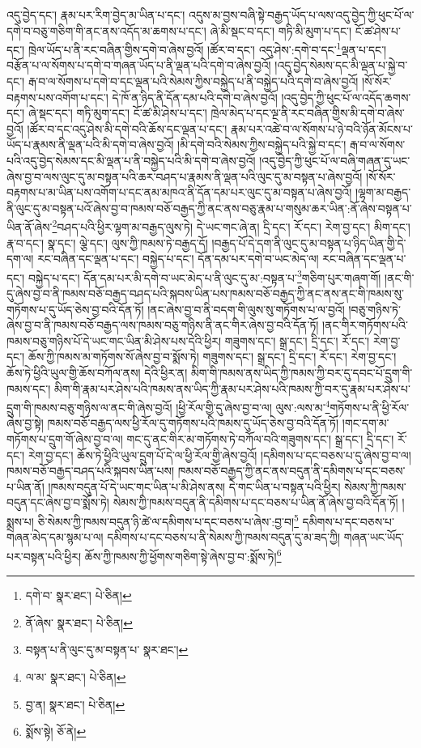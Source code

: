 འདུ་བྱེད་དང་། རྣམ་པར་རིག་བྱེད་མ་ཡིན་པ་དང་། འདུས་མ་བྱས་བཞི་སྟེ་བརྒྱད་ཡོད་པ་ལས་འདུ་བྱེད་ཀྱི་ཕུང་པོ་ལ་དགེ་བ་བཅུ་གཅིག་གི་ནང་ནས་འདོད་མ་ཆགས་པ་དང་། ཞེ་མི་སྡང་བ་དང་། གཏི་མི་མུག་པ་དང་། ངོ་ཚ་ཤེས་པ་དང་། ཁྲེལ་ཡོད་པ་ནི་རང་བཞིན་གྱིས་དགེ་བ་ཞེས་བྱའོ། །ཚོར་བ་དང་། འདུ་ཤེས་:དགེ་བ་དང་\footnote{དགེ་བ་  སྣར་ཐང་།  པེ་ཅིན། }ལྡན་པ་དང་། བརྩོན་པ་ལ་སོགས་པ་དགེ་བ་གཞན་ཡོད་པ་ནི་ལྡན་པའི་དགེ་བ་ཞེས་བྱའོ། །འདུ་བྱེད་སེམས་དང་མི་ལྡན་པ་སྐྱེ་བ་དང་། རྒ་བ་ལ་སོགས་པ་དགེ་བ་དང་ལྡན་པའི་སེམས་ཀྱིས་བསྐྱེད་པ་ནི་བསྐྱེད་པའི་དགེ་བ་ཞེས་བྱའོ། །སོ་སོར་བརྟགས་པས་འགོག་པ་དང་། དེ་ཁོ་ན་ཉིད་ནི་དོན་དམ་པའི་དགེ་བ་ཞེས་བྱའོ། །འདུ་བྱེད་ཀྱི་ཕུང་པོ་ལ་འདོད་ཆགས་དང་། ཞེ་སྡང་དང་། གཏི་མུག་དང་། ངོ་ཚ་མི་ཤེས་པ་དང་། ཁྲེལ་མེད་པ་དང་ལྔ་ནི་རང་བཞིན་གྱིས་མི་དགེ་བ་ཞེས་བྱའོ། །ཚོར་བ་དང་འདུ་ཤེས་མི་དགེ་བའི་ཆོས་དང་ལྡན་པ་དང་། རྣམ་པར་འཚེ་བ་ལ་སོགས་པ་ཉེ་བའི་ཉོན་མོངས་པ་ཡོད་པ་རྣམས་ནི་ལྡན་པའི་མི་དགེ་བ་ཞེས་བྱའོ། །མི་དགེ་བའི་སེམས་ཀྱིས་བསྐྱེད་པའི་སྐྱེ་བ་དང་། རྒ་བ་ལ་སོགས་པའི་འདུ་བྱེད་སེམས་དང་མི་ལྡན་པ་ནི་བསྐྱེད་པའི་མི་དགེ་བ་ཞེས་བྱའོ། །འདུ་བྱེད་ཀྱི་ཕུང་པོ་ལ་བཞི་གཞན་དུ་ཡང་ཞེས་བྱ་བ་ལས་ལུང་དུ་མ་བསྟན་པའི་ཆར་བཤད་པ་རྣམས་ནི་ལྡན་པའི་ལུང་དུ་མ་བསྟན་པ་ཞེས་བྱའོ། །སོ་སོར་བརྟགས་པ་མ་ཡིན་པས་འགོག་པ་དང་ནམ་མཁའ་ནི་དོན་དམ་པར་ལུང་དུ་མ་བསྟན་པ་ཞེས་བྱའོ། །ལྷག་མ་བརྒྱད་ནི་ལུང་དུ་མ་བསྟན་པའོ་ཞེས་བྱ་བ་ཁམས་བཅོ་བརྒྱད་ཀྱི་ནང་ནས་བཅུ་རྣམ་པ་གསུམ་ཆར་ཡིན་:ནོ་ཞེས་བསྟན་པ་ཡིན་ནོ་ཞེས་\footnote{ནོ་ཞེས་  སྣར་ཐང་།  པེ་ཅིན། }བཤད་པའི་ཕྱིར་ལྷག་མ་བརྒྱད་ལུས་ཏེ། དེ་ཡང་གང་ཞེ་ན། དྲི་དང་། རོ་དང་། རེག་བྱ་དང་། མིག་དང་། རྣ་བ་དང་། སྣ་དང་། ལྕེ་དང་། ལུས་ཀྱི་ཁམས་ཏེ་བརྒྱད་དོ། །བརྒྱད་པོ་དེ་དག་ནི་ལུང་དུ་མ་བསྟན་པ་ཉིད་ཡིན་གྱི་དེ་དག་ལ། རང་བཞིན་དང་ལྡན་པ་དང་། བསྐྱེད་པ་དང་། དོན་དམ་པར་དགེ་བ་ཡང་མེད་ལ། རང་བཞིན་དང་ལྡན་པ་དང་། བསྐྱེད་པ་དང་། དོན་དམ་པར་མི་དགེ་བ་ཡང་མེད་པ་ནི་ལུང་དུ་མ་:བསྟན་པ་\footnote{བསྟན་པ་ནི་ལུང་དུ་མ་བསྟན་པ་  སྣར་ཐང་། }གཅིག་པུར་གཞག་གོ། །ནང་གི་དུ་ཞེས་བྱ་བ་ནི་ཁམས་བཅོ་བརྒྱད་བཤད་པའི་སྐབས་ཡིན་པས་ཁམས་བཅོ་བརྒྱད་ཀྱི་ནང་ནས་ནང་གི་ཁམས་སུ་གཏོགས་པ་དུ་ཡོད་ཅེས་བྱ་བའི་དོན་ཏོ། །ནང་ཞེས་བྱ་བ་ནི་བདག་གི་ལུས་སུ་གཏོགས་པ་ལ་བྱའོ། །བཅུ་གཉིས་ཏེ་ཞེས་བྱ་བ་ནི་ཁམས་བཅོ་བརྒྱད་ལས་ཁམས་བཅུ་གཉིས་ནི་ནང་གིར་ཞེས་བྱ་བའི་དོན་ཏོ། །ནང་གིར་གཏོགས་པའི་ཁམས་བཅུ་གཉིས་པོ་དེ་ཡང་གང་ཡིན་མི་ཤེས་པས་དེའི་ཕྱིར། གཟུགས་དང་། སྒྲ་དང་། དྲི་དང་། རོ་དང་། རེག་བྱ་དང་། ཆོས་ཀྱི་ཁམས་མ་གཏོགས་སོ་ཞེས་བྱ་བ་སྨོས་ཏེ། གཟུགས་དང་། སྒྲ་དང་། དྲི་དང་། རོ་དང་། རེག་བྱ་དང་། ཆོས་ཏེ་ཕྱིའི་ཡུལ་གྱི་ཆོས་བཀོལ་ནས། དེའི་ཕྱིར་ན། མིག་གི་ཁམས་ནས་ཡིད་ཀྱི་ཁམས་ཀྱི་བར་དུ་དབང་པོ་དྲུག་གི་ཁམས་དང་། མིག་གི་རྣམ་པར་ཤེས་པའི་ཁམས་ནས་ཡིད་ཀྱི་རྣམ་པར་ཤེས་པའི་ཁམས་ཀྱི་བར་དུ་རྣམ་པར་ཤེས་པ་དྲུག་གི་ཁམས་བཅུ་གཉིས་ལ་ནང་གི་ཞེས་བྱའོ། །ཕྱི་རོལ་གྱི་དུ་ཞེས་བྱ་བ་ལ། ལུས་:ལས་མ་\footnote{ལ་མ་  སྣར་ཐང་།  པེ་ཅིན། }གཏོགས་པ་ནི་ཕྱི་རོལ་ཞེས་བྱ་སྟེ། ཁམས་བཅོ་བརྒྱད་ལས་ཕྱི་རོལ་དུ་གཏོགས་པའི་ཁམས་དུ་ཡོད་ཅེས་བྱ་བའི་དོན་ཏོ། །གང་དག་མ་གཏོགས་པ་དྲུག་གོ་ཞེས་བྱ་བ་ལ། གང་དུ་ནང་གིར་མ་གཏོགས་ཏེ་བཀོལ་བའི་གཟུགས་དང་། སྒྲ་དང་། དྲི་དང་། རོ་དང་། རེག་བྱ་དང་། ཆོས་ཏེ་ཕྱིའི་ཡུལ་དྲུག་པོ་དེ་ལ་ཕྱི་རོལ་གྱི་ཞེས་བྱའོ། །དམིགས་པ་དང་བཅས་པ་དུ་ཞེས་བྱ་བ་ལ། ཁམས་བཅོ་བརྒྱད་བཤད་པའི་སྐབས་ཡིན་པས། ཁམས་བཅོ་བརྒྱད་ཀྱི་ནང་ནས་བདུན་ནི་དམིགས་པ་དང་བཅས་པ་ཡིན་ནོ། །ཁམས་བདུན་པོ་དེ་ཡང་གང་ཡིན་པ་མི་ཤེས་ནས། དེ་གང་ཡིན་པ་བསྟན་པའི་ཕྱིར། སེམས་ཀྱི་ཁམས་བདུན་དང་ཞེས་བྱ་བ་སྨོས་ཏེ། སེམས་ཀྱི་ཁམས་བདུན་ནི་དམིགས་པ་དང་བཅས་པ་ཡིན་ནོ་ཞེས་བྱ་བའི་དོན་ཏོ། །སྨྲས་པ། ཅི་སེམས་ཀྱི་ཁམས་བདུན་ཉི་ཚེ་ལ་དམིགས་པ་དང་བཅས་པ་ཞེས་:བྱ་བ།\footnote{བྱ་ན།  སྣར་ཐང་།  པེ་ཅིན། } དམིགས་པ་དང་བཅས་པ་གཞན་མེད་དམ་སྙམ་པ་ལ། དམིགས་པ་དང་བཅས་པ་ནི་སེམས་ཀྱི་ཁམས་བདུན་དུ་མ་ཟད་ཀྱི། གཞན་ཡང་ཡོད་པར་བསྟན་པའི་ཕྱིར། ཆོས་ཀྱི་ཁམས་ཀྱི་ཕྱོགས་གཅིག་སྟེ་ཞེས་བྱ་བ་:སྨོས་ཏེ།\footnote{སྨོས་སྟེ།  ཅོ་ནེ། } 